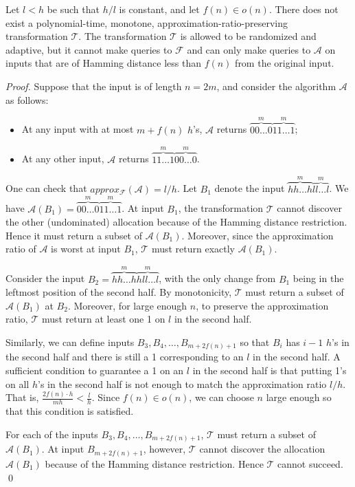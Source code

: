 \documentclass[runningheads,a4paper]{llncs}
\begin{document}
\begin{theorem}
\label{thm:worstcasepointwisehamming}
Let $l<h$ be such that $h/l$ is constant, and let $f(n)\in o(n)$. There does not exist a polynomial-time, monotone, approximation-ratio-preserving transformation $\mathcal{T}$. The transformation $\mathcal{T}$ is allowed to be randomized and adaptive, but it cannot make queries to $\mathcal{F}$ and can only make queries to $\mathcal{A}$ on inputs that are of Hamming distance less than $f(n)$ from the original input.
\end{theorem}

\begin{proof}
Suppose that the input is of length $n=2m$, and consider the algorithm $\mathcal{A}$ as follows:
\begin{itemize}
\item At any input with at most $m+f(n)$ $h$'s, $\mathcal{A}$ returns $\overbrace{00\dots 0}^m\overbrace{11\dots 1}^m$;

\item At any other input, $\mathcal{A}$ returns $\overbrace{11\dots 1}^m\overbrace{00\dots 0}^m$.
\end{itemize}

One can check that $approx_\mathcal{F}(\mathcal{A})=l/h$. Let $B_1$ denote the input $\overbrace{hh\dots h}^m\overbrace{ll\dots l}^m$. We have $\mathcal{A}(B_1)=\overbrace{00\dots 0}^m\overbrace{11\dots 1}^m$. At input $B_1$, the transformation $\mathcal{T}$ cannot discover the other (undominated) allocation because of the Hamming distance restriction. Hence it must return a subset of $\mathcal{A}(B_1)$. Moreover, since the approximation ratio of $\mathcal{A}$ is worst at input $B_1$, $\mathcal{T}$ must return exactly $\mathcal{A}(B_1)$.

Consider the input $B_2=\overbrace{hh\dots h}^m\overbrace{hll\dots l}^m$, with the only change from $B_1$ being in the leftmost position of the second half. By monotonicity, $\mathcal{T}$ must return a subset of $\mathcal{A}(B_1)$ at $B_2$. Moreover, for large enough $n$, to preserve the approximation ratio, $\mathcal{T}$ must return at least one 1 on $l$ in the second half.

Similarly, we can define inputs $B_3,B_4,\dots,B_{m+2f(n)+1}$ so that $B_i$ has $i-1$ $h$'s in the second half and there is still a 1 corresponding to an $l$ in the second half. A sufficient condition to guarantee a 1 on an $l$ in the second half is that putting 1's on all $h$'s in the second half is not enough to match the approximation ratio $l/h$. That is, $\frac{2f(n)\cdot h}{mh}<\frac{l}{h}$. Since $f(n)\in o(n)$, we can choose $n$ large enough so that this condition is satisfied. 

For each of the inputs $B_3,B_4,\dots,B_{m+2f(n)+1}$, $\mathcal{T}$ must return a subset of $\mathcal{A}(B_1)$. At input $B_{m+2f(n)+1}$, however, $\mathcal{T}$ cannot discover the allocation $\mathcal{A}(B_1)$ because of the Hamming distance restriction. Hence $\mathcal{T}$ cannot succeed. \qed
\end{proof}
\end{document}
